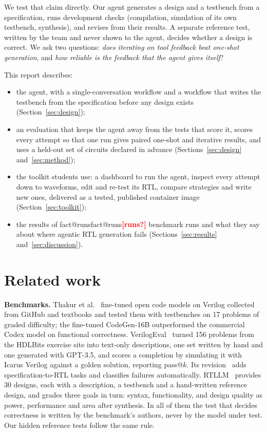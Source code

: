\documentclass[11pt,a4paper]{article}
\makeatletter
\newcommand{\fact}[1]{\ifcsname fact@#1\endcsname\csname fact@#1\endcsname\else\textcolor{red}{\textbf{[#1?]}}\fi}
\makeatother
\begin{document}
We test that claim directly. Our agent generates a design and a testbench from a specification, runs development
checks (compilation, simulation of its own testbench, synthesis), and revises from their results. A separate
reference test, written by the team and never shown to the agent, decides whether a design is correct. We ask two
questions: \emph{does iterating on tool feedback beat one-shot generation}, and \emph{how reliable is the feedback
that the agent gives itself}?

This report describes:
\begin{itemize}
  \item the agent, with a single-conversation workflow and a workflow that writes the testbench from the
        specification before any design exists (Section~\ref{sec:design});
  \item an evaluation that keeps the agent away from the tests that score it, scores every attempt so that one run
        gives paired one-shot and iterative results, and uses a held-out set of circuits declared in advance
        (Sections~\ref{sec:design} and~\ref{sec:method});
  \item the toolkit students use: a dashboard to run the agent, inspect every attempt down to waveforms, edit and
        re-test its RTL, compare strategies and write new ones, delivered as a tested, published container image
        (Section~\ref{sec:toolkit});
  \item the results of \fact{runs} benchmark runs and what they say about where agentic RTL generation fails
        (Sections~\ref{sec:results} and~\ref{sec:discussion}).
\end{itemize}

\section{Related work}\label{sec:related}

\textbf{Benchmarks.} Thakur et al.~\cite{thakur2023} fine-tuned open code models on Verilog collected from GitHub and
textbooks and tested them with testbenches on 17 problems of graded difficulty; the fine-tuned CodeGen-16B outperformed
the commercial Codex model on functional correctness. VerilogEval~\cite{verilogeval} turned 156 problems from the
HDLBits exercise site into text-only descriptions, one set written by hand and one generated with GPT-3.5, and scores
a completion by simulating it with Icarus Verilog against a golden solution, reporting pass@$k$. Its
revision~\cite{revisiting} adds specification-to-RTL tasks and classifies failures automatically.
RTLLM~\cite{rtllm} provides 30 designs, each with a description, a testbench and a hand-written reference design, and
grades three goals in turn: syntax, functionality, and design quality as power, performance and area after synthesis.
In all of them the test that decides correctness is written by the benchmark's authors, never by the model under
test. Our hidden reference tests follow the same rule.
\end{document}
